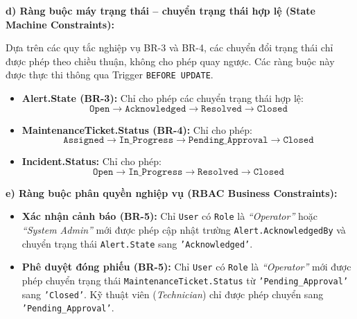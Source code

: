 \vspace{0.5em}
\noindent\textbf{d) Ràng buộc máy trạng thái -- chuyển trạng thái hợp lệ (State Machine Constraints):}

Dựa trên các quy tắc nghiệp vụ BR-3 và BR-4, các chuyển đổi trạng thái chỉ được phép theo chiều thuận, không cho phép quay ngược. Các ràng buộc này được thực thi thông qua Trigger \texttt{BEFORE UPDATE}.

\begin{itemize}[leftmargin=2em]
    \item \textbf{Alert.State (BR-3):} Chỉ cho phép các chuyển trạng thái hợp lệ:
    \[
    \texttt{Open} \rightarrow \texttt{Acknowledged} \rightarrow \texttt{Resolved} \rightarrow \texttt{Closed}
    \]
    
    \item \textbf{MaintenanceTicket.Status (BR-4):} Chỉ cho phép:
    \[
    \texttt{Assigned} \rightarrow \texttt{In\_Progress} \rightarrow \texttt{Pending\_Approval} \rightarrow \texttt{Closed}
    \]
    
    \item \textbf{Incident.Status:} Chỉ cho phép:
    \[
    \texttt{Open} \rightarrow \texttt{In\_Progress} \rightarrow \texttt{Resolved} \rightarrow \texttt{Closed}
    \]
\end{itemize}

\vspace{0.5em}
\noindent\textbf{e) Ràng buộc phân quyền nghiệp vụ (RBAC Business Constraints):}

\begin{itemize}[leftmargin=2em]
    \item \textbf{Xác nhận cảnh báo (BR-5):} Chỉ \texttt{User} có \texttt{Role} là \textit{``Operator''} hoặc \textit{``System Admin''} mới được phép cập nhật trường \texttt{Alert.AcknowledgedBy} và chuyển trạng thái \texttt{Alert.State} sang \texttt{'Acknowledged'}.
    \item \textbf{Phê duyệt đóng phiếu (BR-5):} Chỉ \texttt{User} có \texttt{Role} là \textit{``Operator''} mới được phép chuyển trạng thái \texttt{MaintenanceTicket.Status} từ \texttt{'Pending\_Approval'} sang \texttt{'Closed'}. Kỹ thuật viên (\textit{Technician}) chỉ được phép chuyển sang \texttt{'Pending\_Approval'}.
\end{itemize}
